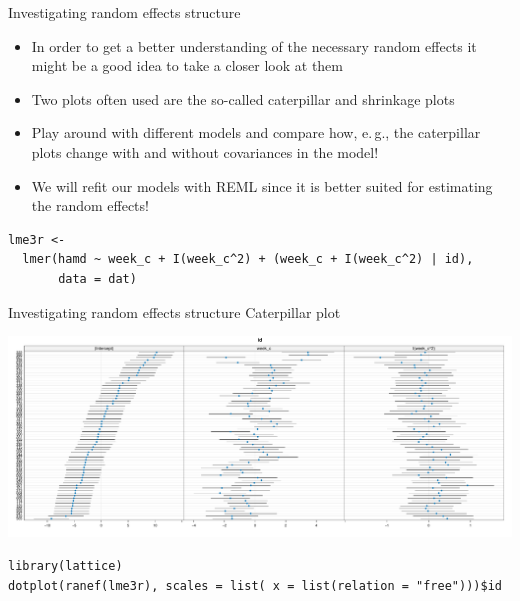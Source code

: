 \documentclass[aspectratio=169]{beamer}
\begin{document}
\begin{frame}[fragile]{Investigating random effects structure}
  \begin{itemize}
    \item In order to get a better understanding of the necessary random effects
      it might be a good idea to take a closer look at them
    \item Two plots often used are the so-called caterpillar and shrinkage plots
    \item Play around with different models and compare how, e.\,g., the
      caterpillar plots change with and without covariances in the model!
      \pause\vspace{.5cm}
    \item We will refit our models with REML since it is better suited for
      estimating the random effects!
  \end{itemize}
\begin{lstlisting}
lme3r <- 
  lmer(hamd ~ week_c + I(week_c^2) + (week_c + I(week_c^2) | id),
       data = dat)
\end{lstlisting}
\end{frame}


\begin{frame}[fragile]{Investigating random effects structure}
  {Caterpillar plot}
  \vspace{-.4cm}
    \begin{center}
      \includegraphics[scale=.25]{../figures/hdrs-caterpillar}
  \end{center}
  \vspace{-.3cm}
\begin{lstlisting}
library(lattice)
dotplot(ranef(lme3r), scales = list( x = list(relation = "free")))$id
\end{lstlisting}
\end{frame}
\end{document}
